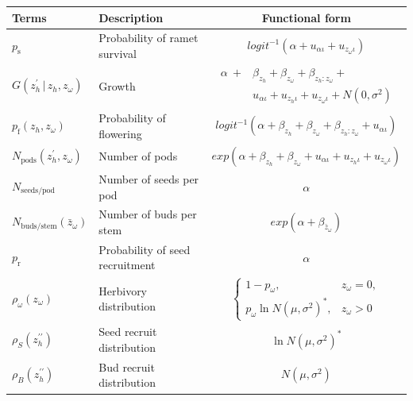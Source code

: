 \documentclass[10pt]{article}
\begin{document}
\begin{framed}
\centering
\begin{tabular}{ |l|l|c| }
\hline
\rowcolor{mygray} 
Terms & Description & Functional form \\ \hline
$p_{\mathrm{s}}$ & Probability of ramet survival & $logit^{-1}(\alpha + u_{\alpha\iota} + u_{z_{\omega}\iota})$ \\
$G(z_{h}^{\prime}\, | \, z_{h},z_{\omega})$ & Growth & $\begin{array}{ll}\alpha \ + & \!\!\!\beta_{z_{h}} + \beta_{z_{\omega}} + \beta_{z_{h}:z_{\omega}} + \\ & \!\!\!u_{\alpha\iota} + u_{z_{h}\iota} + u_{z_{\omega}\iota} + N(0,\sigma^2)\end{array}$ \\
$p_{\mathrm{f}}(z_{h},z_{\omega})$ & Probability of flowering & $logit^{-1}(\alpha + \beta_{z_{h}} + \beta_{z_{\omega}} + \beta_{z_{h}:z_{\omega}} + u_{\alpha\iota})$ \\ 
$N_{\mathrm{pods}}\left(z_{h}^{\prime},z_{\omega}\right)$ & Number of pods & $exp(\alpha + \beta_{z_{h}} + \beta_{z_{\omega}} + u_{\alpha\iota} + u_{z_{h}\iota} + u_{z_{\omega}\iota})$ \\ 
$N_{\mathrm{seeds/pod}}$ & Number of seeds per pod & $\alpha$ \\
$N_{\mathrm{buds/stem}}(\bar{z}_{\omega})$ & Number of buds per stem & $exp(\alpha + \beta_{\bar{z}_{\omega}})$ \\ 
$p_{\mathrm{r}}$ & Probability of seed recruitment & $\alpha$ \\
$\rho_{\omega}(z_{\omega})$ & Herbivory distribution & $\left\{\begin{array}{ll}1-p_{\omega}, & z_{\omega} = 0, \\ p_{\omega}\ln N(\mu, \sigma^2)^{*}, & z_{\omega} > 0\end{array}\right.$ \\
$\rho_{S}(z_{h}^{\prime\prime})$ & Seed recruit distribution & $\ln N(\mu, \sigma^2)^{*}$ \\
$\rho_{B}(z_{h}^{\prime\prime})$ & Bud recruit distribution & $N(\mu, \sigma^2)$ \\
\hline
\end{tabular}

\end{framed}
\end{document}
